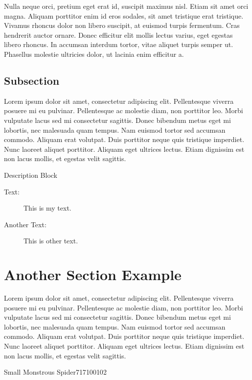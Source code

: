 \documentclass{arcanum}
\begin{document}
Nulla neque orci, pretium eget erat id, suscipit maximus nisl. Etiam sit amet
orci magna. Aliquam porttitor enim id eros sodales, sit amet tristique erat
tristique. Vivamus rhoncus dolor non libero suscipit, at euismod turpis fermentum.
Cras hendrerit auctor ornare. Donec efficitur elit mollis lectus varius, eget
egestas libero rhoncus. In accumsan interdum tortor, vitae aliquet turpis semper
ut. Phasellus molestie ultricies dolor, ut lacinia enim efficitur a.

\subsection{Subsection}
Lorem ipsum dolor sit amet, consectetur adipiscing elit. Pellentesque viverra
posuere mi eu pulvinar. Pellentesque ac molestie diam, non porttitor leo. Morbi
vulputate lacus sed mi consectetur sagittis. Donec bibendum metus eget mi lobortis,
nec malesuada quam tempus. Nam euismod tortor sed accumsan commodo. Aliquam erat
volutpat. Duis porttitor neque quis tristique imperdiet. Nunc laoreet aliquet
porttitor. Aliquam eget ultrices lectus. Etiam dignissim est non lacus mollis,
et egestas velit sagittis.

\begin{descriptionblock}{Description Block}
  \begin{description}
    \item[Text:] This is my text.
    \item[Another Text:] This is other text.
  \end{description}
\end{descriptionblock}

\section{Another Section Example}
Lorem ipsum dolor sit amet, consectetur adipiscing elit. Pellentesque viverra
posuere mi eu pulvinar. Pellentesque ac molestie diam, non porttitor leo. Morbi
vulputate lacus sed mi consectetur sagittis. Donec bibendum metus eget mi lobortis,
nec malesuada quam tempus. Nam euismod tortor sed accumsan commodo. Aliquam erat
volutpat. Duis porttitor neque quis tristique imperdiet. Nunc laoreet aliquet
porttitor. Aliquam eget ultrices lectus. Etiam dignissim est non lacus mollis,
et egestas velit sagittis.

\begin{statblock}[2]{Small Monstrous Spider}{7}{17}{10}{0}{10}{2}
\end{statblock}
\end{document}
